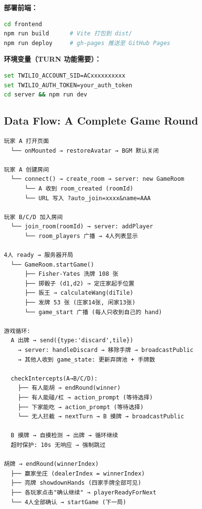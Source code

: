 \documentclass[11pt,a4paper]{article}
\begin{document}
\textbf{部署前端：}
\begin{lstlisting}[language=bash, basicstyle=\ttfamily\small]
cd frontend
npm run build      # Vite 打包到 dist/
npm run deploy     # gh-pages 推送至 GitHub Pages
\end{lstlisting}

\textbf{环境变量（TURN 功能需要）：}
\begin{lstlisting}[language=bash, basicstyle=\ttfamily\small]
set TWILIO_ACCOUNT_SID=ACxxxxxxxxxx
set TWILIO_AUTH_TOKEN=your_auth_token
cd server && npm run dev
\end{lstlisting}

\subsection{Data Flow: A Complete Game Round}

\begin{verbatim}
玩家 A 打开页面
  └── onMounted → restoreAvatar → BGM 默认关闭

玩家 A 创建房间
  └── connect() → create_room → server: new GameRoom
      └── A 收到 room_created (roomId)
      └── URL 写入 ?auto_join=xxxx&name=AAA

玩家 B/C/D 加入房间
  └── join_room(roomId) → server: addPlayer
      └── room_players 广播 → 4人列表显示

4人 ready → 服务器开局
  └── GameRoom.startGame()
      ├── Fisher-Yates 洗牌 108 张
      ├── 掷骰子 (d1,d2) → 定庄家起手位置
      ├── 扳王 → calculateWang(diTile)
      ├── 发牌 53 张 (庄家14张, 闲家13张)
      └── game_start 广播 (每人只收到自己的 hand)

游戏循环:
  A 出牌 → send({type:'discard',tile})
    → server: handleDiscard → 移除手牌 → broadcastPublic
    → 其他人收到 game_state: 更新弃牌池 + 手牌数

  checkIntercepts(A→B/C/D):
    ├── 有人能胡 → endRound(winner)
    ├── 有人能碰/杠 → action_prompt (等待选择)
    ├── 下家能吃 → action_prompt (等待选择)
    └── 无人拦截 → nextTurn → B 摸牌 → broadcastPublic

  B 摸牌 → 自摸检测 → 出牌 → 循环继续
  超时保护: 10s 无响应 → 强制跳过

胡牌 → endRound(winnerIndex)
  ├── 赢家坐庄 (dealerIndex = winnerIndex)
  ├── 亮牌 showdownHands (四家手牌全部可见)
  ├── 各玩家点击"确认继续" → playerReadyForNext
  └── 4人全部确认 → startGame (下一局)
\end{verbatim}

\end{document}
